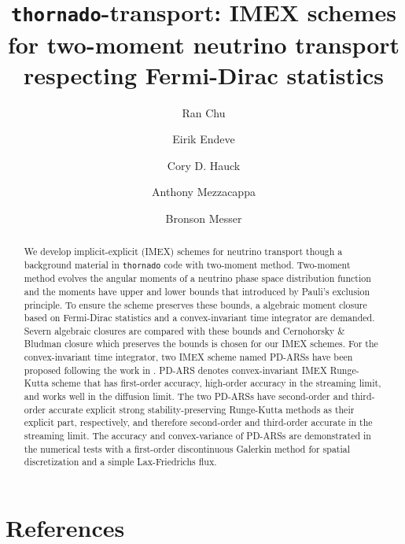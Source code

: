 \documentclass[a4paper]{jpconf}
\begin{document}
\title{\texttt{thornado}-transport: IMEX schemes for two-moment neutrino transport respecting Fermi-Dirac statistics}

\author{Ran Chu}
\address{Department of Physics and Astronomy, University of Tennessee Knoxville, TN 37996-1200}

\author{Eirik Endeve}
\address{Computational and Applied Mathematics Group, Oak Ridge National Laboratory, Oak Ridge, TN 37831 USA}
\address{Department of Physics and Astronomy, University of Tennessee Knoxville, TN 37996-1200}

\author{Cory D. Hauck}
\address{Computational and Applied Mathematics Group, Oak Ridge National Laboratory, Oak Ridge, TN 37831 USA}
\address{Department of Mathematics, University of Tennessee Knoxville, TN 37996-1320}

\author{Anthony Mezzacappa}
\address{Department of Physics and Astronomy, University of Tennessee Knoxville, TN 37996-1200}

\author{Bronson Messer}
\address{Scientific Computing and Theoretical Physics Groups, Oak Ridge National Laboratory, Oak Ridge, TN 37831 USA}
\address{Department of Physics and Astronomy, University of Tennessee Knoxville, TN 37996-1200}

\begin{abstract}
We develop implicit-explicit (IMEX) schemes for neutrino transport though a background material in \texttt{thornado} code with two-moment method.
Two-moment method evolves the angular moments of a neutrino phase space distribution function and the moments have upper and lower bounds that introduced by Pauli's exclusion principle.
To ensure the scheme preserves these bounds, a algebraic moment closure based on Fermi-Dirac statistics and a convex-invariant time integrator are demanded.
Severn algebraic closures are compared with these bounds and Cernohorsky \& Bludman closure which preserves the bounds is chosen for our IMEX schemes.
For the convex-invariant time integrator, two IMEX scheme named PD-ARSs have been proposed following the work in \cite{chu_2018}.
PD-ARS denotes convex-invariant IMEX Runge-Kutta scheme that has first-order accuracy, high-order accuracy in the streaming limit, and works well in the diffusion limit.
The two PD-ARSs have second-order and third-order accurate explicit strong stability-preserving Runge-Kutta methods\cite{gottlieb_etal_2001} as their explicit part, respectively, and therefore second-order and third-order accurate in the streaming limit.
The accuracy and convex-variance of PD-ARSs are demonstrated in the numerical tests with a first-order discontinuous Galerkin method for spatial discretization and a simple Lax-Friedrichs flux.

\end{abstract}








\section*{References}

\end{document}
